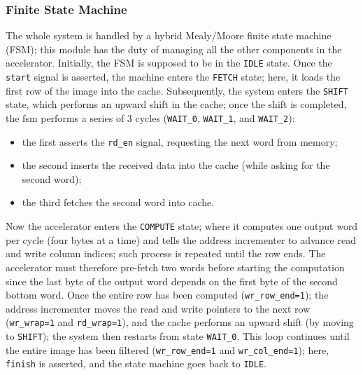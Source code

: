 \subsubsection{Finite State Machine}

The whole system is handled by a hybrid Mealy/Moore finite state machine (FSM); this module has the duty of managing all the other components in the accelerator. Initially, the FSM is supposed to be in the \texttt{IDLE} state. Once the \texttt{start} signal is asserted, the machine enters the \texttt{FETCH} state; here, it loads the first row of the image into the cache. Subsequently, the system enters the \texttt{SHIFT} state, which performs an upward shift in the cache; once the shift is completed, the fsm performs a series of 3 cycles (\texttt{WAIT\_0}, \texttt{WAIT\_1}, and \texttt{WAIT\_2}): 
\begin{itemize}
    \item the first asserts the \texttt{rd\_en} signal, requesting the next word from memory;
    \item the second inserts the received data into the cache (while asking for the second word);
    \item the third fetches the second word into cache.
\end{itemize}
Now the accelerator enters the \texttt{COMPUTE} state; where it computes one output word per cycle (four bytes at a time) and tells the address incrementer to advance read and write column indices; such process is repeated until the row ends. The accelerator must therefore pre-fetch two words before starting the computation since the last byte of the output word depends on the first byte of the second bottom word. Once the entire row has been computed (\texttt{wr\_row\_end=1}); the address incrementer moves the read and write pointers to the next row (\texttt{wr\_wrap=1} and \texttt{rd\_wrap=1}), and the cache performs an upward shift (by moving to \texttt{SHIFT}); the system then restarts from state \texttt{WAIT\_0}. This loop continues until the entire image has been filtered (\texttt{wr\_row\_end=1} and \texttt{wr\_col\_end=1}); here, \texttt{finish} is asserted, and the state machine goes back to \texttt{IDLE}.

